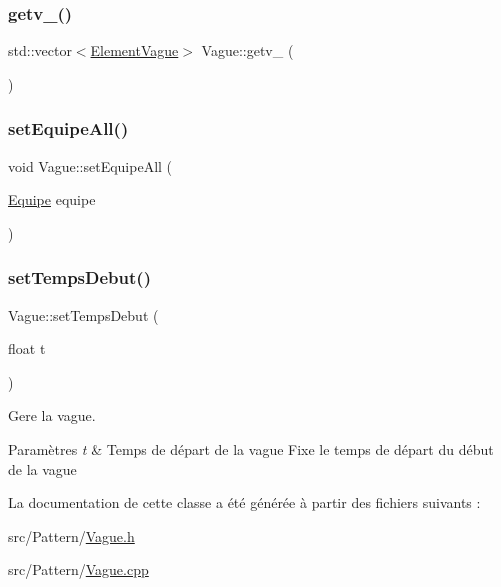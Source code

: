 \subsubsection{\texorpdfstring{getv\+\_\+()}{getv\_()}}
{\footnotesize\ttfamily std\+::vector$<$\hyperlink{struct_element_vague}{Element\+Vague}$>$ Vague\+::getv\+\_\+ (\begin{DoxyParamCaption}{ }\end{DoxyParamCaption})\hspace{0.3cm}{\ttfamily [inline]}}

\mbox{\label{class_vague_aed7f0a70cc0d93ed686af4e100376974}} 
\subsubsection{\texorpdfstring{set\+Equipe\+All()}{setEquipeAll()}}
{\footnotesize\ttfamily void Vague\+::set\+Equipe\+All (\begin{DoxyParamCaption}\item[{\hyperlink{constantes_8h_a08fa5554288d5031a8f3bb83cc04ee83}{Equipe}}]{equipe }\end{DoxyParamCaption})\hspace{0.3cm}{\ttfamily [inline]}}

\mbox{\label{class_vague_a564d612f69751dd198ffa7ac61ea04dd}} 
\subsubsection{\texorpdfstring{set\+Temps\+Debut()}{setTempsDebut()}}
{\footnotesize\ttfamily Vague\+::set\+Temps\+Debut (\begin{DoxyParamCaption}\item[{float}]{t }\end{DoxyParamCaption})}



Gere la vague. 


\begin{DoxyParams}{Paramètres}
{\em t} & Temps de départ de la vague Fixe le temps de départ du début de la vague \\
\hline
\end{DoxyParams}


La documentation de cette classe a été générée à partir des fichiers suivants \+:\begin{DoxyCompactItemize}
\item 
src/\+Pattern/\hyperlink{_vague_8h}{Vague.\+h}\item 
src/\+Pattern/\hyperlink{_vague_8cpp}{Vague.\+cpp}\end{DoxyCompactItemize}
